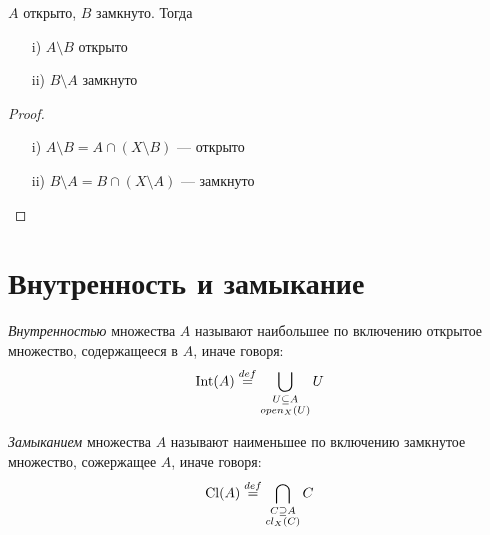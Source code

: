 \begin{theorem}
    $A$ открыто, $B$ замкнуто. Тогда

    \begin{itemize}
        \item[i)] $A \setminus B$ открыто
        \item[ii)] $B \setminus A$ замкнуто
    \end{itemize}
\end{theorem}
\begin{proof}
    \enewline
    \begin{itemize}
        \item[i)] $A \setminus B = A \cap (X \setminus B)$ --- открыто
        \item[ii)] $B \setminus A = B \cap (X \setminus A)$ --- замкнуто
    \end{itemize}
\end{proof}

\section{Внутренность и замыкание}

\begin{definition}
    \textit{Внутренностью} множества $A$ называют наибольшее по включению
    открытое множество, содержащееся в $A$, иначе говоря:
\[
    \operatorname{Int}(A) \overset{def}{\underset{}{=}} \bigcup_{\substack{U \subseteq A \\open_X(U)}}{U}
\]
\end{definition}

\begin{definition}
    \textit{Замыканием} множества $A$ называют наименьшее по включению
    замкнутое множество, сожержащее $A$, иначе говоря:
\[
    \operatorname{Cl}(A) \overset{def}{\underset{}{=}} \bigcap_{\substack{C \supseteq A \\cl_X(C)}}{C}
\]
\end{definition}

